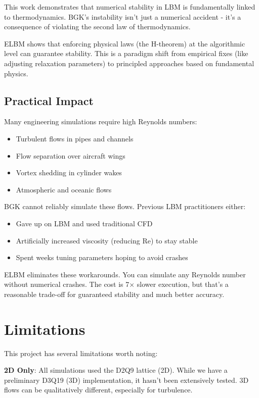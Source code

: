 This work demonstrates that numerical stability in LBM is fundamentally linked to thermodynamics. BGK's instability isn't just a numerical accident - it's a consequence of violating the second law of thermodynamics.

ELBM shows that enforcing physical laws (the H-theorem) at the algorithmic level can guarantee stability. This is a paradigm shift from empirical fixes (like adjusting relaxation parameters) to principled approaches based on fundamental physics.

\subsection{Practical Impact}

Many engineering simulations require high Reynolds numbers:
\begin{itemize}
    \item Turbulent flows in pipes and channels
    \item Flow separation over aircraft wings
    \item Vortex shedding in cylinder wakes
    \item Atmospheric and oceanic flows
\end{itemize}

BGK cannot reliably simulate these flows. Previous LBM practitioners either:
\begin{itemize}
    \item Gave up on LBM and used traditional CFD
    \item Artificially increased viscosity (reducing Re) to stay stable
    \item Spent weeks tuning parameters hoping to avoid crashes
\end{itemize}

ELBM eliminates these workarounds. You can simulate any Reynolds number without numerical crashes. The cost is 7× slower execution, but that's a reasonable trade-off for guaranteed stability and much better accuracy.

\section{Limitations}

This project has several limitations worth noting:

\textbf{2D Only}: All simulations used the D2Q9 lattice (2D). While we have a preliminary D3Q19 (3D) implementation, it hasn't been extensively tested. 3D flows can be qualitatively different, especially for turbulence.

